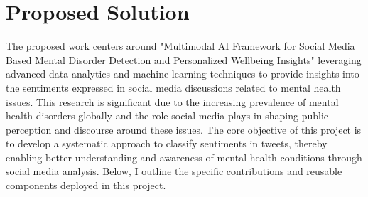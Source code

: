 
\section{Proposed Solution}
\noindent
The proposed work centers around "Multimodal AI Framework for Social Media Based Mental Disorder Detection and Personalized Wellbeing Insights" leveraging advanced data analytics and machine learning techniques to provide insights into the sentiments expressed in social media discussions related to mental health issues. This research is significant due to the increasing prevalence of mental health disorders globally and the role social media plays in shaping public perception and discourse around these issues. The core objective of this project is to develop a systematic approach to classify sentiments in tweets, thereby enabling better understanding and awareness of mental health conditions through social media analysis. Below, I outline the specific contributions and reusable components deployed in this project.

